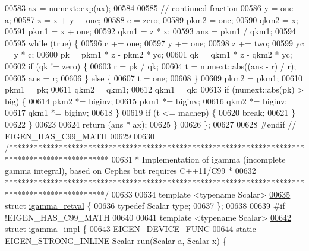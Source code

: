 \begin{DoxyCode}
00583     ax = numext::exp(ax);
00584 
00585     \textcolor{comment}{// continued fraction}
00586     y = one - a;
00587     z = x + y + one;
00588     c = zero;
00589     pkm2 = one;
00590     qkm2 = x;
00591     pkm1 = x + one;
00592     qkm1 = z * x;
00593     ans = pkm1 / qkm1;
00594 
00595     \textcolor{keywordflow}{while} (\textcolor{keyword}{true}) \{
00596       c += one;
00597       y += one;
00598       z += two;
00599       yc = y * c;
00600       pk = pkm1 * z - pkm2 * yc;
00601       qk = qkm1 * z - qkm2 * yc;
00602       \textcolor{keywordflow}{if} (qk != zero) \{
00603         r = pk / qk;
00604         t = numext::abs((ans - r) / r);
00605         ans = r;
00606       \} \textcolor{keywordflow}{else} \{
00607         t = one;
00608       \}
00609       pkm2 = pkm1;
00610       pkm1 = pk;
00611       qkm2 = qkm1;
00612       qkm1 = qk;
00613       \textcolor{keywordflow}{if} (numext::abs(pk) > big) \{
00614         pkm2 *= biginv;
00615         pkm1 *= biginv;
00616         qkm2 *= biginv;
00617         qkm1 *= biginv;
00618       \}
00619       \textcolor{keywordflow}{if} (t <= machep) \{
00620         \textcolor{keywordflow}{break};
00621       \}
00622     \}
00623 
00624     \textcolor{keywordflow}{return} (ans * ax);
00625   \}
00626 \};
00627 
00628 \textcolor{preprocessor}{#endif  // EIGEN\_HAS\_C99\_MATH}
00629 
00630 \textcolor{comment}{/************************************************************************************************}
00631 \textcolor{comment}{ * Implementation of igamma (incomplete gamma integral), based on Cephes but requires C++11/C99 *}
00632 \textcolor{comment}{ ************************************************************************************************/}
00633 
00634 \textcolor{keyword}{template} <\textcolor{keyword}{typename} Scalar>
\hyperlink{struct_eigen_1_1internal_1_1igamma__retval}{00635} \textcolor{keyword}{struct }\hyperlink{struct_eigen_1_1internal_1_1igamma__retval}{igamma\_retval} \{
00636   \textcolor{keyword}{typedef} Scalar type;
00637 \};
00638 
00639 \textcolor{preprocessor}{#if !EIGEN\_HAS\_C99\_MATH}
00640 
00641 \textcolor{keyword}{template} <\textcolor{keyword}{typename} Scalar>
\hyperlink{struct_eigen_1_1internal_1_1igamma__impl}{00642} \textcolor{keyword}{struct }\hyperlink{struct_eigen_1_1internal_1_1igamma__impl}{igamma\_impl} \{
00643   EIGEN\_DEVICE\_FUNC
00644   \textcolor{keyword}{static} EIGEN\_STRONG\_INLINE Scalar run(Scalar a, Scalar x) \{

\end{DoxyCode}
